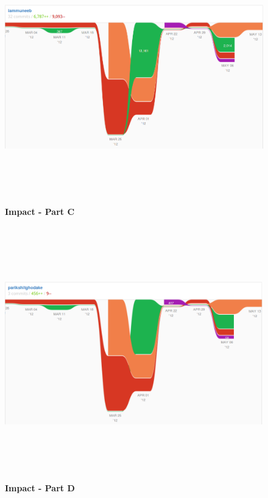 \begin{figure}[H]
  \centering
    \includegraphics[height= 11cm, width=17cm]{project/images/GitHub/impact-muneeb}
  \caption{\textbf{Impact - Part C}}
\end{figure}
\vspace{1cm}
\begin{figure}[H]
  \centering
    \includegraphics[height= 11cm, width=17cm]{project/images/GitHub/impact-parikshit}
  \caption{\textbf{Impact - Part D}}
\end{figure}